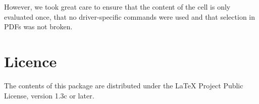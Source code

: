 \documentclass{article}
\begin{document}
However, we took great care to ensure that the content of the cell is only evaluated once, that no driver-specific commands were used and that selection in PDFs was not broken.

\section{Licence}

The contents of this package are distributed under the \LaTeX{} Project
Public License,
version 1.3c or later.
\end{document}
